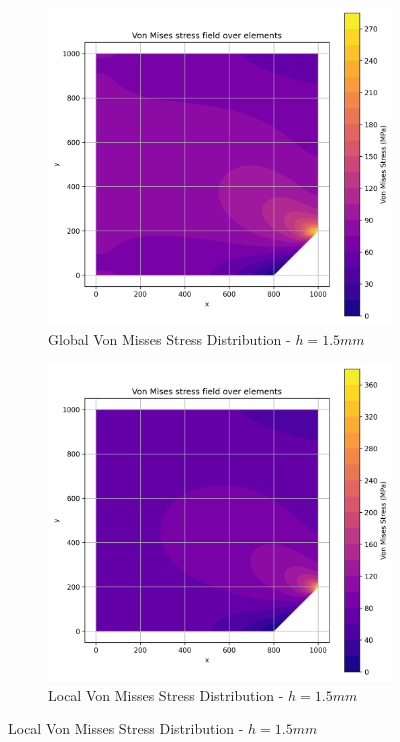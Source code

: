 \begin{figure}[H]
  \centering
  \begin{subfigure}[b]{0.45\textwidth}
    \centering
    \includegraphics[width=\textwidth]{GRAFICOS/Quad4/1.5mm_global/resultados_von_mises.png}
    \caption{Global Von Misses Stress Distribution - $h=1.5mm$}
    \label{fig:img12}
  \end{subfigure}
  \hfill
  \begin{subfigure}[b]{0.45\textwidth}
    \centering
    \includegraphics[width=\textwidth]{GRAFICOS/Quad4/1.5mm_local/resultados_von_mises.png}
    \caption{Local Von Misses Stress Distribution - $h=1.5mm$}
    \label{fig:img22}
  \end{subfigure}
\end{figure}

